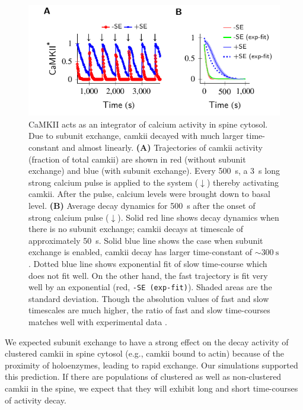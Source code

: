 \documentclass[9pt,lineno,doublespacing]{elife}
\begin{document}
\begin{figure}%
    \centering
    \includegraphics[]{PaperFigures/elifeFigure6/figure_two_timecourses_87mm.pdf}
    \caption{CaMKII acts as an integrator of calcium activity in spine cytosol.
        Due to subunit exchange, \gls{camkii} decayed with much larger
        time-constant and almost linearly. \textbf{(A)} Trajectories
        of \gls{camkii} activity (fraction of total \gls{camkii})
        are shown in red (without subunit exchange) and blue (with
        subunit exchange). Every \SI{500}{\second}, a \SI{3}{\second}
        long strong calcium pulse is applied to the system ($\downarrow$)
        thereby activating \gls{camkii}.  After the pulse, calcium levels
        were brought down to basal level. \textbf{(B)} Average decay
        dynamics for \SI{500}{\second} after the onset of strong calcium
        pulse ($\downarrow$). Solid red line shows decay dynamics when
        there is no subunit exchange; \gls{camkii} decays at timescale of
        approximately \SI{50}{\second}. Solid blue line shows the case when
        subunit exchange is enabled, \gls{camkii} decay has larger
        time-constant of $\sim\SI{300}{\second}$. Dotted blue line shows exponential
        fit of slow time-course which does not fit well. On the other hand, the fast
        trajectory is fit very well by an exponential (red, \texttt{-SE (exp-fit)}). 
        Shaded areas are the standard deviation. Though the absolution values of 
        fast and slow timescales are much higher, the ratio of fast and slow time-courses
        matches well with experimental data \citep{chang_camkii_2017}.
    }\label{fig:cytosol_integrator}
\end{figure}

We expected subunit exchange to have a strong effect on the decay activity of 
clustered \gls{camkii} in spine cytosol (e.g., \gls{camkii} bound to actin)
because of the proximity of holoenzymes, leading to rapid exchange. 
Our simulations supported this prediction. If there are populations of 
clustered as well as non-clustered \gls{camkii} in the spine, we expect that
they will exhibit long and short time-courses of activity decay.
\end{document}
